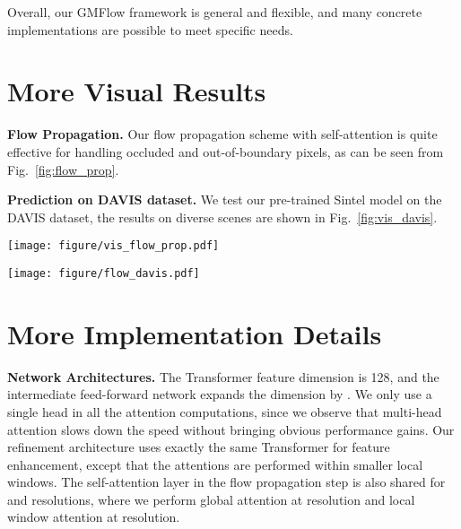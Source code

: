 \documentclass[10pt,twocolumn,letterpaper]{article}
\begin{document}
Overall, our GMFlow framework is general and flexible, and many concrete implementations are possible to meet specific needs.






\section{More Visual Results}

{\bf Flow Propagation.} Our flow propagation scheme with self-attention is quite effective for handling occluded and out-of-boundary pixels, as can be seen from Fig.~\ref{fig:flow_prop}.

{\bf Prediction on DAVIS dataset.} We test our pre-trained Sintel model on the DAVIS \cite{perazzi2016benchmark} dataset, the results on diverse scenes are shown in Fig.~\ref{fig:vis_davis}.







\begin{figure*}[t]
    \centering
    \texttt{[image: figure/vis\_flow\_prop.pdf]}
    \caption{Our \textbf{flow propagation} (prop.) scheme significantly improves the performance of occluded and out-of-boundary pixels.}
    \label{fig:flow_prop}
\end{figure*}






\begin{figure*}[t]
    \centering
    \texttt{[image: figure/flow\_davis.pdf]}
    \caption{\textbf{Visual results on DAVIS dataset}.}
    \label{fig:vis_davis}
\end{figure*}






\section{More Implementation Details}


{\bf Network Architectures.} The Transformer feature dimension is 128, and the intermediate feed-forward network expands the dimension by . We only use a single head in all the attention computations, since we observe that multi-head attention slows down the speed without bringing obvious performance gains. Our refinement architecture uses exactly the same Transformer for feature enhancement, except that the attentions are performed within smaller local windows. The self-attention layer in the flow propagation step is also shared for  and  resolutions, where we perform global attention at  resolution and local  window attention at  resolution. 
\end{document}

